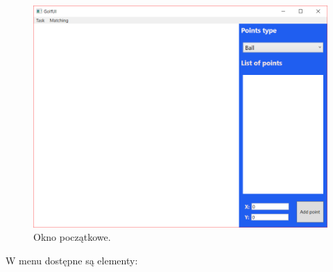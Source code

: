 \documentclass[10pt,a4paper]{article}
\begin{document}
	\begin{figure}[H]
		\centering	
 			\includegraphics[scale=0.6]{images/initial.png}
 			\caption{Okno początkowe.}
 		\label{fig:algorithm_diagram}
	\end{figure}	
	
	W menu dostępne są elementy:
	
\end{document}
